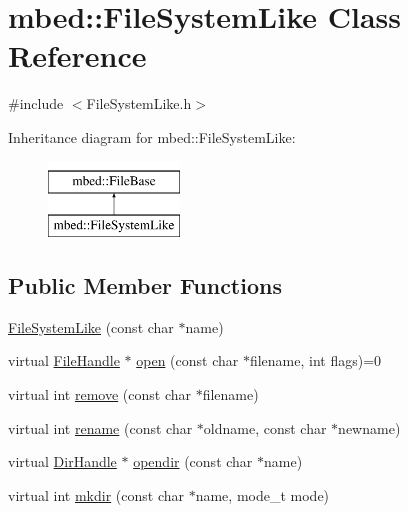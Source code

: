 \hypertarget{classmbed_1_1_file_system_like}{}\section{mbed\+:\+:File\+System\+Like Class Reference}
\label{classmbed_1_1_file_system_like}


{\ttfamily \#include $<$File\+System\+Like.\+h$>$}

Inheritance diagram for mbed\+:\+:File\+System\+Like\+:\begin{figure}[H]
\begin{center}
\leavevmode
\includegraphics[height=2.000000cm]{classmbed_1_1_file_system_like}
\end{center}
\end{figure}
\subsection*{Public Member Functions}
\begin{DoxyCompactItemize}
\item 
\hyperlink{classmbed_1_1_file_system_like_adaf42774569bda270f4f686623722b19}{File\+System\+Like} (const char $\ast$name)
\item 
virtual \hyperlink{classmbed_1_1_file_handle}{File\+Handle} $\ast$ \hyperlink{classmbed_1_1_file_system_like_a6809574c7498d7683c6576977ffd3b4b}{open} (const char $\ast$filename, int flags)=0
\item 
virtual int \hyperlink{classmbed_1_1_file_system_like_af3db57c1a612e1ca59c88da3488194ee}{remove} (const char $\ast$filename)
\item 
virtual int \hyperlink{classmbed_1_1_file_system_like_a32cef6f224a3fa357d8e7e1d59002f16}{rename} (const char $\ast$oldname, const char $\ast$newname)
\item 
virtual \hyperlink{classmbed_1_1_dir_handle}{Dir\+Handle} $\ast$ \hyperlink{classmbed_1_1_file_system_like_a7e07c43201e03d0b3d0ecebd0c40bf04}{opendir} (const char $\ast$name)
\item 
virtual int \hyperlink{classmbed_1_1_file_system_like_ac397d79d5aead33cdda1070ef3f56b38}{mkdir} (const char $\ast$name, mode\+\_\+t mode)
\end{DoxyCompactItemize}
